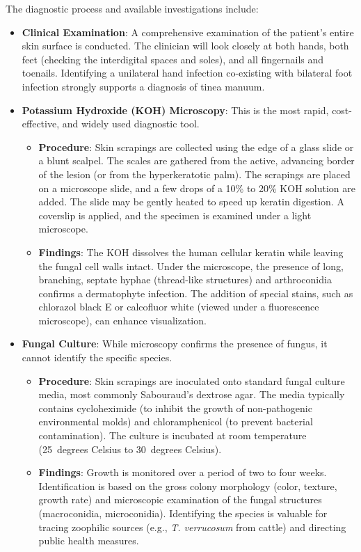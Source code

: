 The diagnostic process and available investigations include:
\begin{itemize}
    \item \textbf{Clinical Examination}: A comprehensive examination of the patient's entire skin surface is conducted. The clinician will look closely at both hands, both feet (checking the interdigital spaces and soles), and all fingernails and toenails. Identifying a unilateral hand infection co-existing with bilateral foot infection strongly supports a diagnosis of tinea manuum.
    \item \textbf{Potassium Hydroxide (KOH) Microscopy}: This is the most rapid, cost-effective, and widely used diagnostic tool.
    \begin{itemize}
        \item \textbf{Procedure}: Skin scrapings are collected using the edge of a glass slide or a blunt scalpel. The scales are gathered from the active, advancing border of the lesion (or from the hyperkeratotic palm). The scrapings are placed on a microscope slide, and a few drops of a 10\% to 20\% KOH solution are added. The slide may be gently heated to speed up keratin digestion. A coverslip is applied, and the specimen is examined under a light microscope.
        \item \textbf{Findings}: The KOH dissolves the human cellular keratin while leaving the fungal cell walls intact. Under the microscope, the presence of long, branching, septate hyphae (thread-like structures) and arthroconidia confirms a dermatophyte infection. The addition of special stains, such as chlorazol black E or calcofluor white (viewed under a fluorescence microscope), can enhance visualization.
    \end{itemize}
    \item \textbf{Fungal Culture}: While microscopy confirms the presence of fungus, it cannot identify the specific species.
    \begin{itemize}
        \item \textbf{Procedure}: Skin scrapings are inoculated onto standard fungal culture media, most commonly Sabouraud's dextrose agar. The media typically contains cycloheximide (to inhibit the growth of non-pathogenic environmental molds) and chloramphenicol (to prevent bacterial contamination). The culture is incubated at room temperature (25~degrees Celsius to 30~degrees Celsius).
        \item \textbf{Findings}: Growth is monitored over a period of two to four weeks. Identification is based on the gross colony morphology (color, texture, growth rate) and microscopic examination of the fungal structures (macroconidia, microconidia). Identifying the species is valuable for tracing zoophilic sources (e.g., \textit{T. verrucosum} from cattle) and directing public health measures.

\end{itemize}
\end{itemize}
